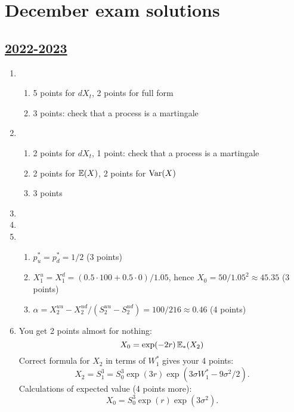 
\newpage
\thispagestyle{empty}
\section{December exam solutions}
\subsection[2022-2023]{\hyperref[sec:kr_02_2022_2023]{2022-2023}}
\label{sec:sol_kr_02_2022_2023} %

\begin{enumerate}
\item 
\begin{enumerate}
    \item 5 points for $dX_t$, 2 points for full form
    \item 3 points: check that a process is a martingale
\end{enumerate}

\item 
\begin{enumerate}
    \item 2 points for $dX_t$, 1 point: check that a process is a martingale
    \item 2 points for $\operatorname{\mathbb{E}}(X)$, 2 points for $\operatorname{Var}(X)$
    \item 3 points
\end{enumerate}

\item 
\item 

\item \begin{enumerate}
    \item $p^*_u = p^*_d = 1/2$ (3 points)
    \item $X_1^u = X_1^d = (0.5\cdot 100 + 0.5\cdot 0) / 1.05$, hence $X_0 = 50/1.05^2 \approx 45.35$ (3 points)
    \item $\alpha = X_2^{uu} - X_2^{ud} / (S_2^{uu} - S_2^{ud}) = 100/216 \approx 0.46$ (4 points)
\end{enumerate}

\item 
You get 2 points almost for nothing:
\[
X_0 = \exp(-2r) \operatorname{\mathbb{E}}_{*}(X_2)    
\]
Correct formula for $X_2$ in terms of $W_1^*$ gives your 4 points:
\[
X_2 = S_1^3 = S_0^3 \exp(3r)\exp(3\sigma W_1^* - 9\sigma^2/2).    
\]
Calculations of expected value (4 points more):
\[
X_0 = S_0^3 \exp(r)\exp(3\sigma^2).    
\]

\end{enumerate}

